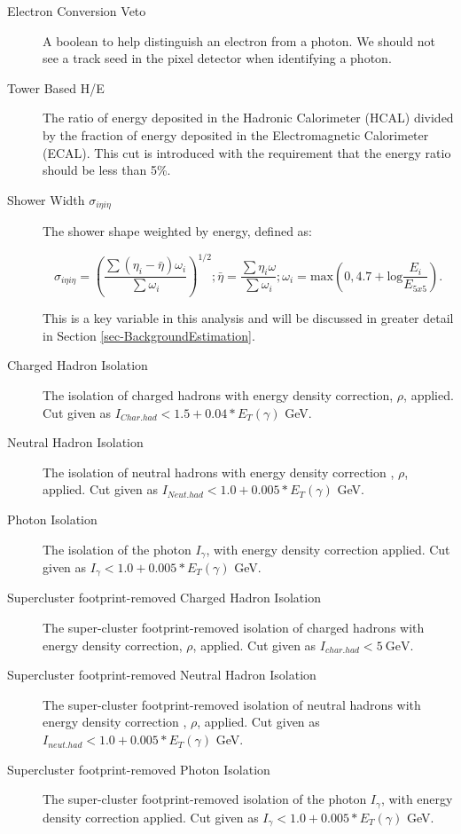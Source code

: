 \begin{description}

\item[Electron Conversion Veto] A boolean to help distinguish an electron from a photon. We should not see a track seed in the pixel detector when identifying a photon. 

\item[Tower Based H/E] The ratio of energy deposited in the Hadronic Calorimeter (HCAL) divided by the fraction of energy deposited in the Electromagnetic Calorimeter (ECAL). This cut is introduced with the requirement that the energy ratio should be less than 5\%.

\item[Shower Width $\sigma_{i\eta i\eta}$] The shower shape weighted by energy, defined as: 

\begin{equation}
\sigma_{i\eta i\eta} = \left(\frac{\sum(\eta_i - \bar{\eta})\omega_i}{\sum\omega_i}\right)^{1/2};  \bar{\eta} = \frac{\sum\eta_i\omega}{\sum\omega_i};  \omega_i = \text{max}\left(0, 4.7 +
\text{log}\frac{E_i}{E_{5x5}}\right).
\end{equation}

This is a key variable in this analysis and will be discussed in greater detail in Section \ref{sec-BackgroundEstimation}.

\item[Charged Hadron Isolation] The isolation of charged hadrons with energy density correction, $\rho$, applied. Cut given as $I_{Char.had} < 1.5 + 0.04*E_T(\gamma)$ GeV. 

\item[Neutral Hadron Isolation] The isolation of neutral hadrons with energy density correction , $\rho$, applied. Cut given as $I_{Neut.had} < 1.0 + 0.005*E_T(\gamma)$ GeV. 

\item[Photon Isolation] The isolation of the photon $I_{\gamma}$, with energy density correction applied. Cut given as $I_{\gamma} < 1.0 + 0.005*E_T(\gamma)$ GeV.


\item[Supercluster footprint-removed Charged Hadron Isolation] The super-cluster footprint-removed isolation of charged hadrons with energy density correction, $\rho$, applied.
Cut given as $I_{char.had} < 5 \ \text{GeV} $. 

\item[Supercluster footprint-removed Neutral Hadron Isolation] The super-cluster footprint-removed isolation of neutral hadrons with energy density correction , $\rho$, applied.
Cut given as $I_{neut.had} < 1.0 + 0.005*E_T(\gamma)$ GeV. 

\item[Supercluster footprint-removed Photon Isolation] The super-cluster footprint-removed isolation of the photon $I_{\gamma}$, with energy density correction applied. Cut given
as $I_{\gamma} < 1.0 + 0.005*E_T(\gamma)$ GeV. 

\end{description}

